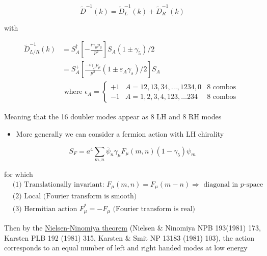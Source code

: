 \begin{equation}
\tilde{D}^{-1}(k)=\tilde{D}_{L}^{-1}(k)+\tilde{D}_{R}^{-1}(k)
\end{equation}

with

\begin{equation}
\begin{aligned}
 \tilde{D}_{L / R}^{-1}(k)&=S_{A}^{\dagger}\left[-\frac{i\gamma_{\mu} p_{\mu}}{p^{2}}\right] S_{A}\left(1 \pm \gamma_{5}\right) / 2 \\
& =S_{A}^{+}\left[\frac{-i \gamma_{\mu}p_\mu}{p^{2}}\left(1 \pm \varepsilon_{A} \gamma_{s}\right) / 2\right] S_{A} \\
& \text { where } \epsilon_{A}=\left\{\begin{array}{lll} 
+1 & A=12,13,34,\ldots,1234,0 & 8 \text { combos } \\
-1 & A=1,2,3,4,123, \ldots 234 & 8 \text { combos }
\end{array}\right.
\end{aligned}
\end{equation}

Meaning that the 16 doubler modes appear as $8$ LH and $8$ RH modes

\begin{itemize}
  \item More generally we can consider a fermion action with LH chirality
\end{itemize}

\begin{equation}
S_{F}=a^{4} \sum_{m, n} \bar{\psi}_{n} \gamma_{\mu} F_{\mu}(m, n)\left(1-\gamma_{5}\right) \psi_{m}
\end{equation}

for which
\begin{equation}
    \begin{aligned}
        &\text{(1) Translationally invariant: \(F_{\mu}(m, n)=F_{\mu}(m-n) \Rightarrow\) diagonal in $p$-space}\\
&\text{(2) Local (Fourier transform is smooth)}\\
&\text{(3) Hermitian action \(F_{\mu}^{*}=-F_{\mu}\) (Fourier transform is real)}
    \end{aligned}
    \label{eq:NNreq}
\end{equation}

Then by the \underline{Nielsen-Ninomiya theorem} (Nielsen \& Ninomiya NPB 193(1981) 173, Karsten PLB 192 (1981) 315, Karsten \& Smit NP 13183 (1981) 103), the action corresponds to an equal number of left and right handed modes at low energy

